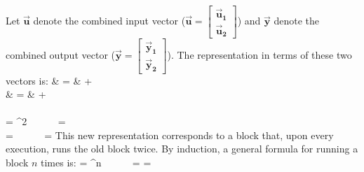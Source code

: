 {Let $\vec{\mathbf{u}}$ denote the combined input vector ($\vec{\mathbf{u}}
= \left [ \begin{array} {c} \vec{\mathbf{u}}_{{\mathbf 1}}
\\ \vec{\mathbf{u}}_{{\mathbf 2}} \end{array} \right ]$) and $\vec{\mathbf{y}}$ denote the 
combined output vector ($\vec{\mathbf{y}} = \left [ \begin{array} {c}
\vec{\mathbf{y}}_{{\mathbf 1}}
\\ \vec{\mathbf{y}}_{{\mathbf 2}} \end{array} \right ]$). The representation in terms of these two
vectors is:
\starteqnstar
{} & = &  +  \\
 & = &  + 
\doneeqnstar ~ \\ \vspace{-36pt} ~ \\
\starteqnstar
{} = ^2 ~~~~~
 =   \\
 =  ~~~~~
 = 
\doneeqnstar
This new representation corresponds to a block that, upon every
execution, runs the old block twice.  By induction, a general formula
for running a block $n$ times is:
\starteqnstar
{} = ^n ~~~~~
 = 
\doneeqnstar
\starteqnstar
{} = ~~~~~~~~~~~~~~~~~~~~~~~~~~~~~~~~~~~~~~~~~~~~~~~~~~~ \\
}

